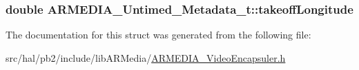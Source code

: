 \subsubsection[{\texorpdfstring{takeoff\+Longitude}{takeoffLongitude}}]{\setlength{\rightskip}{0pt plus 5cm}double A\+R\+M\+E\+D\+I\+A\+\_\+\+Untimed\+\_\+\+Metadata\+\_\+t\+::takeoff\+Longitude}\hypertarget{struct_a_r_m_e_d_i_a___untimed___metadata__t_ad0441afac05d28c6f952274a6faeba06}{}\label{struct_a_r_m_e_d_i_a___untimed___metadata__t_ad0441afac05d28c6f952274a6faeba06}


The documentation for this struct was generated from the following file\+:\begin{DoxyCompactItemize}
\item 
src/hal/pb2/include/lib\+A\+R\+Media/\hyperlink{_a_r_m_e_d_i_a___video_encapsuler_8h}{A\+R\+M\+E\+D\+I\+A\+\_\+\+Video\+Encapsuler.\+h}\end{DoxyCompactItemize}
